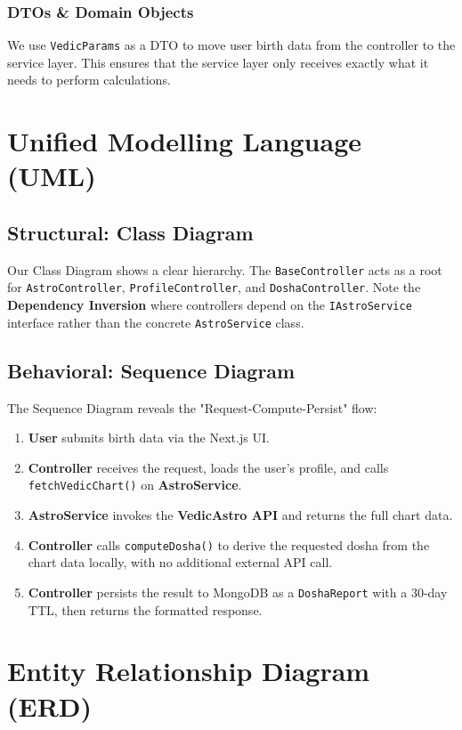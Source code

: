 \documentclass[12pt,a4paper]{article}
\begin{document}
\subsubsection{DTOs \& Domain Objects}
We use \texttt{VedicParams} as a DTO to move user birth data from the controller to the service layer. This ensures that the service layer only receives exactly what it needs to perform calculations.

\section{Unified Modelling Language (UML)}

\subsection{Structural: Class Diagram}
Our Class Diagram shows a clear hierarchy. The \texttt{BaseController} acts as a root for \texttt{AstroController}, \texttt{ProfileController}, and \texttt{DoshaController}. Note the \textbf{Dependency Inversion} where controllers depend on the \texttt{IAstroService} interface rather than the concrete \texttt{AstroService} class.

\subsection{Behavioral: Sequence Diagram}
The Sequence Diagram reveals the "Request-Compute-Persist" flow:
\begin{enumerate}
    \item \textbf{User} submits birth data via the Next.js UI.
    \item \textbf{Controller} receives the request, loads the user's profile, and calls \texttt{fetchVedicChart()} on \textbf{AstroService}.
    \item \textbf{AstroService} invokes the \textbf{VedicAstro API} and returns the full chart data.
    \item \textbf{Controller} calls \texttt{computeDosha()} to derive the requested dosha from the chart data locally, with no additional external API call.
    \item \textbf{Controller} persists the result to MongoDB as a \texttt{DoshaReport} with a 30-day TTL, then returns the formatted response.
\end{enumerate}

\section{Entity Relationship Diagram (ERD)}
\end{document}

